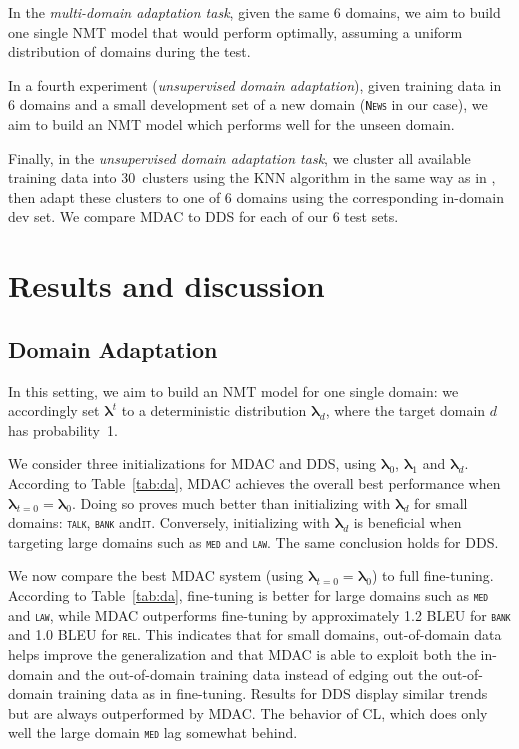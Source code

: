 \documentclass[11pt]{article}
\newcommand{\domain}[1]{\texttt{\textsc{#1}}}
\newcommand{\vlambda}{\ensuremath{\boldsymbol\lambda}\xspace} %
\begin{document}
In the \emph{multi-domain adaptation task}, given the same 6 domains, we aim to build one single NMT model that would perform optimally, assuming a uniform distribution of domains during the test.

In a fourth experiment (\emph{unsupervised domain adaptation}), given training data in 6 domains and a small development set of a new domain (\domain{News} in our case), we aim to build an NMT model which performs well for the unseen domain.

Finally, in the \emph{unsupervised domain adaptation task}, we cluster all available training data into 30~clusters using the KNN algorithm in the same way as in \citep{Tars18multidomain}, then adapt these clusters to one of 6 domains using the corresponding in-domain dev set. We compare MDAC to DDS for each of our 6 test sets.

\section{Results and discussion \label{sec:results}}

\subsection{Domain Adaptation}\label{ssec:da}
In this setting, we aim to build an NMT model for one single domain: we accordingly set $\vlambda^t$ to a deterministic distribution $\vlambda_d$, where the target domain $d$ has probability~1.

We consider three initializations for MDAC and DDS, using $\vlambda_0$, $\vlambda_1$ and $\vlambda_d$. According to Table~\ref{tab:da}, MDAC achieves the overall best performance when $\vlambda_{t=0} = \vlambda_0$.  Doing so proves much better than initializing with $\vlambda_d$ for small domains: \domain{talk}, \domain{bank} and\domain{it}. Conversely, initializing with $\vlambda_d$ is beneficial when targeting large domains such as \domain{med} and \domain{law}. The same conclusion holds for DDS. 

We now compare the best MDAC system (using $\vlambda_{t=0} = \vlambda_0$) to full fine-tuning. According to Table~\ref{tab:da}, fine-tuning is better for large domains such as \domain{med} and \domain{law}, while MDAC outperforms fine-tuning by approximately 1.2 BLEU for \domain{bank} and 1.0 BLEU for \domain{rel}. This indicates that for small domains, out-of-domain data helps improve the generalization and that MDAC is able to exploit both the in-domain and the out-of-domain training data instead of edging out the out-of-domain training data as in fine-tuning. Results for DDS display similar trends but are always outperformed by MDAC. The behavior of CL, which does only well the large domain \domain{med} lag somewhat behind.
\end{document}
